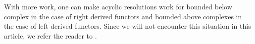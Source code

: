 \documentclass{article}
\begin{document}

With more work,
one can make acyclic resolutions work for 
bounded below complex in the case of right derived functors
and bounded above complexes in the case of left derived functors.
Since we will not encounter this situation in this article,
we refer the reader to
\cite[\href{https://stacks.math.columbia.edu/tag/05TA}{Tag 05TA}]{stacks-project}.
\end{document}
